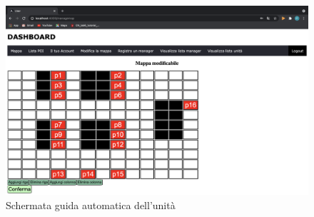 \begin{figure}[H]
    \centering
    \includegraphics[scale=0.12]{res/images/managemap_admni1.png}
    \caption{Schermata guida automatica dell'unità}
\end{figure}

